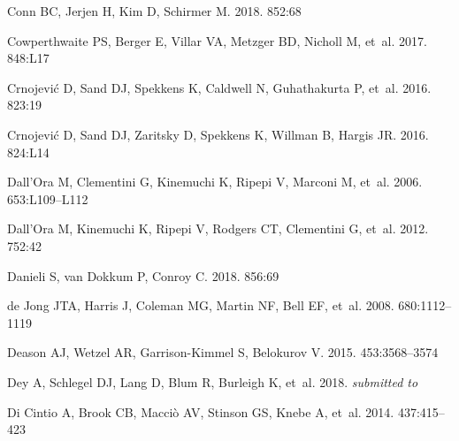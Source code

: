\documentclass[a4paper]{ar-1col}
\begin{document}
\begin{thebibliography}{}
{Conn} BC, {Jerjen} H, {Kim} D, {Schirmer} M. 2018.
\textit{\apj} 852:68

{Cowperthwaite} PS, {Berger} E, {Villar} VA, {Metzger} BD, {Nicholl} M, et~al.
  2017.
\textit{\apjl} 848:L17

{Crnojevi{\'c}} D, {Sand} DJ, {Spekkens} K, {Caldwell} N, {Guhathakurta} P,
  et~al. 2016{}.
\textit{\apj} 823:19

{Crnojevi{\'c}} D, {Sand} DJ, {Zaritsky} D, {Spekkens} K, {Willman} B, {Hargis}
  JR. 2016{}.
\textit{\apjl} 824:L14

{Dall'Ora} M, {Clementini} G, {Kinemuchi} K, {Ripepi} V, {Marconi} M, et~al.
  2006.
\textit{\apjl} 653:L109--L112

{Dall'Ora} M, {Kinemuchi} K, {Ripepi} V, {Rodgers} CT, {Clementini} G, et~al.
  2012.
\textit{\apj} 752:42

{Danieli} S, {van Dokkum} P, {Conroy} C. 2018.
\textit{\apj} 856:69

{de Jong} JTA, {Harris} J, {Coleman} MG, {Martin} NF, {Bell} EF, et~al. 2008.
\textit{\apj} 680:1112--1119

{Deason} AJ, {Wetzel} AR, {Garrison-Kimmel} S, {Belokurov} V. 2015.
\textit{\mnras} 453:3568--3574

{Dey} A, {Schlegel} DJ, {Lang} D, {Blum} R, {Burleigh} K, et~al. 2018.
\textit{submitted to \aj}

{Di Cintio} A, {Brook} CB, {Macci{\`o}} AV, {Stinson} GS, {Knebe} A, et~al.
  2014.
\textit{\mnras} 437:415--423


\end{thebibliography}
\end{document}
